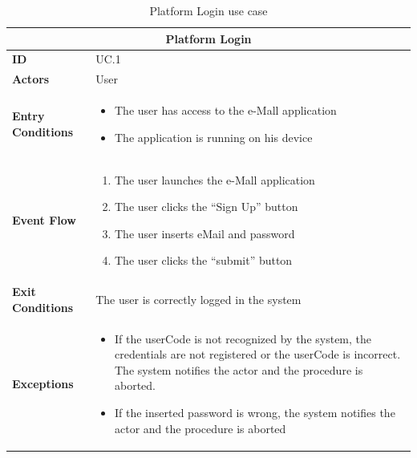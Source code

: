 \documentclass[12pt]{report}
\begin{document}
    \begin{table}[h]
    \centering
    \begin{tabular}{ |p{4cm}|p{11cm}|  }
        \hline
        \multicolumn{2}{|c|}{\textbf{Platform Login}} \\
        \hline
            \textbf{ID} &  UC.1\\
        \hline
            \textbf{Actors} & User\\
        \hline
            \textbf{Entry Conditions} &
                \begin{itemize}
                    \item The user has access to the e-Mall application
                    \item The application is running on his device
                \end{itemize}\\
        \hline
            \textbf{Event Flow} &
                \begin{enumerate}
                    \item The user launches the e-Mall application
                    \item The user clicks the “Sign Up” button
                    \item The user inserts eMail and password
                    \item The user clicks the “submit” button
                \end{enumerate}\\
        \hline
            \textbf{Exit Conditions} & The user is correctly logged in the system\\
        \hline
            \textbf{Exceptions} &
                \begin{itemize}
                    \item If the userCode is not recognized by the system, the credentials are not registered or the userCode is incorrect. The system notifies the actor and the procedure is aborted.
                    \item If the inserted password is wrong, the system notifies the actor and the procedure is aborted
                \end{itemize}\\
        \hline
    \end{tabular}
    \caption{\label{demo-table}Platform Login use case}
    \end{table}
    

    \clearpage
\end{document}
